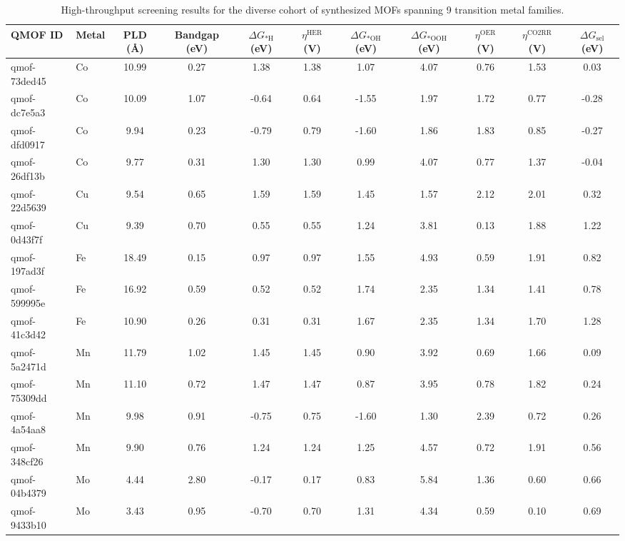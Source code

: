 \begin{table}[t]
\centering
\scriptsize
\caption{High-throughput screening results for the diverse cohort of synthesized MOFs spanning 9 transition metal families.}
\label{tab:high_throughput_summary}
\begin{tabular}{llccccccccc}
\hline\hline
QMOF ID & Metal & PLD (\AA) & Bandgap (eV) & $\Delta G_{*\mathrm{H}}$ (eV) & $\eta^{\mathrm{HER}}$ (V) & $\Delta G_{*\mathrm{OH}}$ (eV) & $\Delta G_{*\mathrm{OOH}}$ (eV) & $\eta^{\mathrm{OER}}$ (V) & $\eta^{\mathrm{CO2RR}}$ (V) & $\Delta G_{\mathrm{sel}}$ (eV) \\
\hline
qmof-73ded45 & Co & 10.99 & 0.27 & 1.38 & 1.38 & 1.07 & 4.07 & 0.76 & 1.53 & 0.03 \\
qmof-dc7e5a3 & Co & 10.09 & 1.07 & -0.64 & 0.64 & -1.55 & 1.97 & 1.72 & 0.77 & -0.28 \\
qmof-dfd0917 & Co & 9.94 & 0.23 & -0.79 & 0.79 & -1.60 & 1.86 & 1.83 & 0.85 & -0.27 \\
qmof-26df13b & Co & 9.77 & 0.31 & 1.30 & 1.30 & 0.99 & 4.07 & 0.77 & 1.37 & -0.04 \\
qmof-22d5639 & Cu & 9.54 & 0.65 & 1.59 & 1.59 & 1.45 & 1.57 & 2.12 & 2.01 & 0.32 \\
qmof-0d43f7f & Cu & 9.39 & 0.70 & 0.55 & 0.55 & 1.24 & 3.81 & 0.13 & 1.88 & 1.22 \\
qmof-197ad3f & Fe & 18.49 & 0.15 & 0.97 & 0.97 & 1.55 & 4.93 & 0.59 & 1.91 & 0.82 \\
qmof-599995e & Fe & 16.92 & 0.59 & 0.52 & 0.52 & 1.74 & 2.35 & 1.34 & 1.41 & 0.78 \\
qmof-41c3d42 & Fe & 10.90 & 0.26 & 0.31 & 0.31 & 1.67 & 2.35 & 1.34 & 1.70 & 1.28 \\
qmof-5a2471d & Mn & 11.79 & 1.02 & 1.45 & 1.45 & 0.90 & 3.92 & 0.69 & 1.66 & 0.09 \\
qmof-75309dd & Mn & 11.10 & 0.72 & 1.47 & 1.47 & 0.87 & 3.95 & 0.78 & 1.82 & 0.24 \\
qmof-4a54aa8 & Mn & 9.98 & 0.91 & -0.75 & 0.75 & -1.60 & 1.30 & 2.39 & 0.72 & 0.26 \\
qmof-348cf26 & Mn & 9.90 & 0.76 & 1.24 & 1.24 & 1.25 & 4.57 & 0.72 & 1.91 & 0.56 \\
qmof-04b4379 & Mo & 4.44 & 2.80 & -0.17 & 0.17 & 0.83 & 5.84 & 1.36 & 0.60 & 0.66 \\
qmof-9433b10 & Mo & 3.43 & 0.95 & -0.70 & 0.70 & 1.31 & 4.34 & 0.59 & 0.10 & 0.69 \\

\end{tabular}
\end{table}
